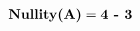 \documentclass[preview]{standalone}
\begin{document}
\begin{align*}
\textbf{\text{Nullity}(A)} = \textbf{\text{4} -  \textbf{3}}
\end{align*}
\end{document}
